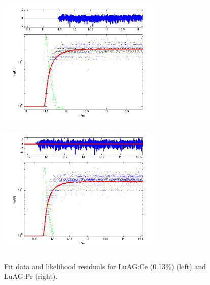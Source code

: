 

\begin{figure}[htbp]
\begin{center}
\includegraphics[width=8cm,height=6.5cm]{../Pictures/Chapter_7/luag_2735_0_13.png}
\includegraphics[width=8cm,height=6.5cm]{../Pictures/Chapter_7/luagpr.png}
\end{center}
\caption[LuAG:Ce (0.13$\%$) and LuAG:Pr profile]{Fit data and likelihood residuals for LuAG:Ce (0.13$\%$) (left) and LuAG:Pr (right).}
\label{fig:pr_bgo}
\end{figure}

